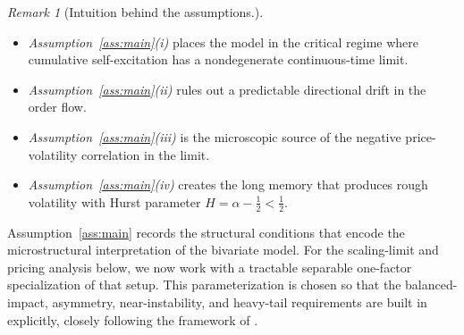 \documentclass[letterpaper]{article}
\numberwithin{equation}{section}
\theoremstyle{definition}
\theoremstyle{remark}
\newtheorem{remark}[theorem]{Remark}
\begin{document}
\begin{remark}[Intuition behind the assumptions.]
\begin{itemize}
    \item \textit{Assumption~\ref{ass:main}(i)} places the model in the critical regime where cumulative self-excitation has a nondegenerate continuous-time limit.
    \item \textit{Assumption~\ref{ass:main}(ii)} rules out a predictable directional drift in the order flow.
    \item \textit{Assumption~\ref{ass:main}(iii)} is the microscopic source of the negative price-volatility correlation in the limit.
    \item \textit{Assumption~\ref{ass:main}(iv)} creates the long memory that produces rough volatility with Hurst parameter $H=\alpha-\frac12<\frac12$.
\end{itemize}
\end{remark}

Assumption~\ref{ass:main} records the structural conditions that encode the microstructural interpretation of the bivariate model. For the scaling-limit and pricing analysis below, we now work with a tractable separable one-factor specialization of that setup. This parameterization is chosen so that the balanced-impact, asymmetry, near-instability, and heavy-tail requirements are built in explicitly, closely following the framework of \cite{el2019characteristic}.
\end{document}
